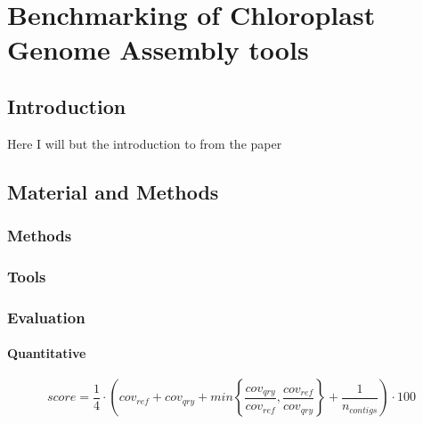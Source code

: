 
\chapter{Benchmarking of Chloroplast Genome Assembly tools } %

\label{Chapter1} %


\newcommand{\keyword}[1]{\textbf{#1}}
\newcommand{\tabhead}[1]{\textbf{#1}}
\newcommand{\code}[1]{\texttt{#1}}
\newcommand{\file}[1]{\texttt{\bfseries#1}}
\newcommand{\option}[1]{\texttt{\itshape#1}}


\section{Introduction}

Here I will but the introduction to from the paper
\section{Material and Methods}
\subsection{Methods}
\subsection{Tools}
\subsection{Evaluation}
\subsubsection{Quantitative}
\begin{equation}
score = \frac{1}{4} \cdot \left( cov_{ref} +  cov_{qry} + min\left\{ \frac{cov_{qry}}{cov_{ref}}, \frac{cov_{ref}}{cov_{qry}}\right\} + \frac{1}{n_{contigs} }\right) \cdot 100 
\label{eqn:score_ass}
\end{equation}

